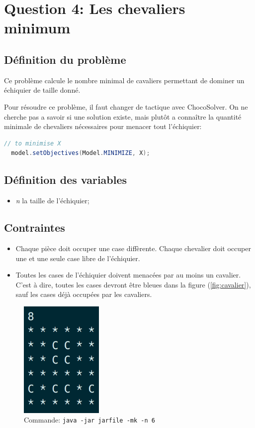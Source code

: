 \documentclass[letterpaper]{article}
\begin{document}
\section{Question 4: Les chevaliers minimum}

\subsection{Définition du problème}

Ce problème calcule le nombre minimal de cavaliers permettant de dominer
un échiquier de taille donné.

Pour résoudre ce problème, il faut changer de tactique avec
ChocoSolver. On ne cherche pas a savoir si une solution existe, mais
plutôt a connaître la quantité minimale de chevaliers nécessaires pour
menacer tout l'échiquier:

\begin{lstlisting}[language=java]
  // to minimise X
  model.setObjectives(Model.MINIMIZE, X);
\end{lstlisting}

\subsection{Définition des variables}

\begin{itemize}
\item \textit{n} la taille de l'échiquier;
\end{itemize}

\subsection{Contraintes}

\begin{itemize}
\item Chaque pièce doit occuper une case diffèrente. Chaque chevalier
  doit occuper une et une seule case libre de l'échiquier.
\item Toutes les cases de l'échiquier doivent menacées par au moins un
  cavalier. C'est à dire, toutes les cases devront être bleues dans la
  figure (\ref{fig:cavalier}), sauf les cases déjà occupées par les cavaliers.
\end{itemize}

\begin{figure}[ht]
  \centering
  \label{fig:ss-knights}
  \includegraphics[width=4cm]{fig/ss-knights.png}
  \caption{Commande: \texttt{java -jar jarfile -mk -n 6}}
\end{figure}
\end{document}
